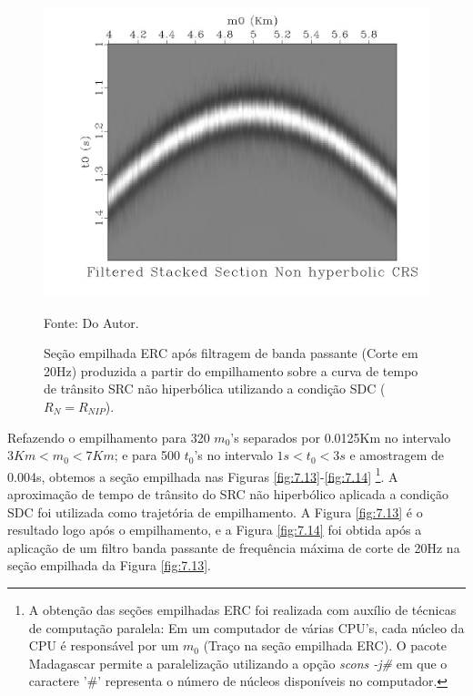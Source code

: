 \begin{figure}
\caption{Seção empilhada ERC após filtragem de banda passante (Corte em 20Hz) produzida a partir do empilhamento 
sobre a curva de tempo de trânsito SRC não hiperbólica
utilizando a condição SDC ($R_N=R_{NIP}$).}
\begin{center}
\includegraphics[scale=0.4]{images/filteredStackedSectionNcrs.jpeg}
\vspace{-0.3cm}
\end{center}
\begin{center}
 Fonte: Do Autor.
\end{center}
\label{fig:7.12}
\end{figure}

Refazendo o empilhamento para 320 $m_0$'s separados por 0.0125Km no intervalo
$3Km<m_0<7Km$; e para 500 $t_0$'s no intervalo $1s<t_0<3s$ e amostragem de 0.004s,
obtemos a seção empilhada nas Figuras \ref{fig:7.13}-\ref{fig:7.14}
\footnote{A obtenção das seções empilhadas ERC foi realizada com auxílio de técnicas de computação paralela: Em um computador
de várias CPU's, cada núcleo da CPU é responsável por um $m_0$ (Traço na seção empilhada ERC). O pacote Madagascar permite a
paralelização utilizando a opção \textit{scons -j\#} em que o caractere '\#' representa o número 
de núcleos disponíveis no computador.}.
A aproximação de tempo de trânsito do SRC não hiperbólico aplicada a condição SDC
foi utilizada como trajetória de empilhamento. A Figura \ref{fig:7.13} é o resultado logo após o empilhamento, e
a Figura \ref{fig:7.14} foi obtida após a aplicação de um filtro banda passante de frequência máxima de corte de 20Hz
na seção empilhada da Figura \ref{fig:7.13}.

